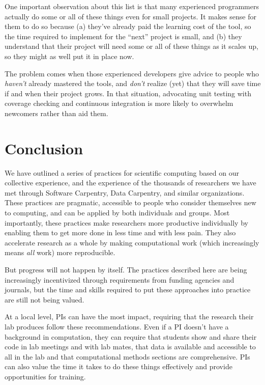 \documentclass[10pt,letterpaper]{article}
\begin{document}
One important observation about this list is that many experienced
programmers actually do some or all of these things even for small
projects. It makes sense for them to do so because (a) they've already
paid the learning cost of the tool, so the time required to implement
for the ``next'' project is small, and (b) they understand that their
project will need some or all of these things as it scales up, so they
might as well put it in place now.

The problem comes when those experienced developers give advice to
people who \emph{haven't} already mastered the tools, and \emph{don't}
realize (yet) that they will save time if and when their project
grows.  In that situation, advocating unit testing with coverage
checking and continuous integration is more likely to overwhelm
newcomers rather than aid them.

\section*{Conclusion}

We have outlined a series of practices for scientific computing based
on our collective experience, and the experience of the thousands of
researchers we have met through Software Carpentry, Data Carpentry,
and similar organizations.  These practices are pragmatic, accessible
to people who consider themselves new to computing, and can be applied
by both individuals and groups.  Most importantly, these practices
make researchers more productive individually by enabling them to get
more done in less time and with less pain.  They also accelerate
research as a whole by making computational work (which increasingly
means \emph{all} work) more reproducible.

But progress will not happen by itself. The practices described here
are being increasingly incentivized through requirements from funding
agencies and journals, but the time and skills required to put these
approaches into practice are still not being valued.

At a local level, PIs can have the most impact, requiring that the
research their lab produces follow these recommendations. Even if a PI
doesn't have a background in computation, they can require that
students show and share their code in lab meetings and with lab mates,
that data is available and accessible to all in the lab and that
computational methods sections are comprehensive. PIs can also value
the time it takes to do these things effectively and provide
opportunities for training.
\end{document}
